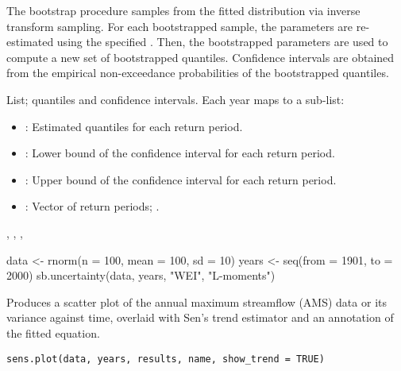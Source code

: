 \documentclass[a4paper]{book}
\begin{document}
%
\begin{Details}
The bootstrap procedure samples from the fitted distribution via inverse
transform sampling. For each bootstrapped sample, the parameters are re-estimated
using the specified . Then, the bootstrapped parameters are used to compute
a new set of bootstrapped quantiles. Confidence intervals are obtained from the
empirical non-exceedance probabilities of the bootstrapped quantiles.
\end{Details}
%
\begin{Value}
List; quantiles and confidence intervals. Each year maps to a sub-list:
\begin{itemize}

\item{} : Estimated quantiles for each return period.
\item{} : Lower bound of the confidence interval for each return period.
\item{} : Upper bound of the confidence interval for each return period.
\item{} : Vector of return periods; .

\end{itemize}

\end{Value}
%
\begin{SeeAlso}
, , , 
\end{SeeAlso}
%
\begin{Examples}
\begin{ExampleCode}
data <- rnorm(n = 100, mean = 100, sd = 10)
years <- seq(from = 1901, to = 2000)
sb.uncertainty(data, years, "WEI", "L-moments")

\end{ExampleCode}
\end{Examples}
%
\begin{Description}
Produces a scatter plot of the annual maximum streamflow (AMS) data or its variance
against time, overlaid with Sen’s trend estimator and an annotation of the fitted
equation.
\end{Description}
%
\begin{Usage}
\begin{verbatim}
sens.plot(data, years, results, name, show_trend = TRUE)
\end{verbatim}
\end{Usage}
\end{document}
